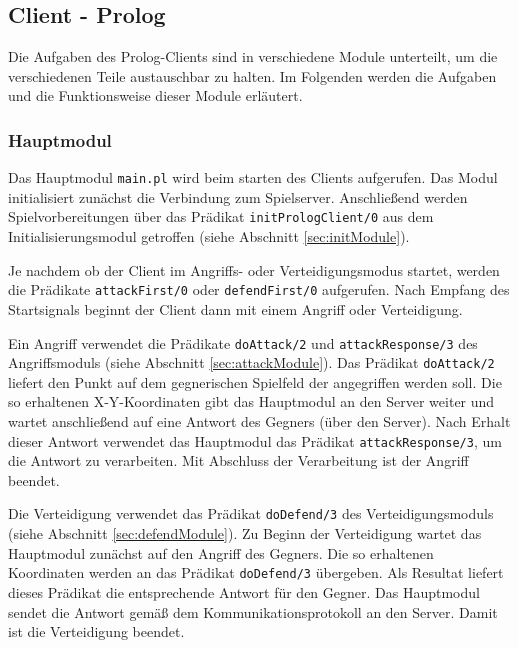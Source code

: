 \subsection{Client - Prolog} \label{sec:Prologclient}
	Die Aufgaben des Prolog-Clients sind in verschiedene Module unterteilt, um die verschiedenen Teile austauschbar zu halten. 
	Im Folgenden werden die Aufgaben und die Funktionsweise dieser Module erläutert.
	



\subsubsection{Hauptmodul}
	Das Hauptmodul \texttt{main.pl} wird beim starten des Clients aufgerufen. Das Modul initialisiert zunächst die Verbindung zum
	Spielserver. Anschließend werden Spielvorbereitungen über das Prädikat \texttt{initPrologClient/0} aus dem 
	Initialisierungsmodul getroffen (siehe Abschnitt \ref{sec:initModule}).
	
	Je nachdem ob der Client im Angriffs- oder Verteidigungsmodus startet, werden die Prädikate \texttt{attackFirst/0} oder
	\texttt{defendFirst/0} aufgerufen. Nach Empfang des Startsignals beginnt der Client dann mit einem Angriff oder Verteidigung.
	
	Ein Angriff verwendet die Prädikate \texttt{doAttack/2} und \texttt{attackResponse/3} des Angriffsmoduls (siehe Abschnitt
	\ref{sec:attackModule}).
	Das Prädikat \texttt{doAttack/2} liefert den Punkt auf dem gegnerischen Spielfeld der angegriffen werden soll.
	Die so erhaltenen X-Y-Koordinaten gibt das Hauptmodul an den Server weiter und wartet anschließend auf eine Antwort des 
	Gegners (über den Server). 
	Nach Erhalt dieser Antwort verwendet das Hauptmodul das Prädikat \texttt{attackResponse/3}, um die Antwort zu verarbeiten.
	Mit Abschluss der Verarbeitung ist der Angriff beendet.
	
	Die Verteidigung verwendet das Prädikat \texttt{doDefend/3} des Verteidigungsmoduls (siehe Abschnitt \ref{sec:defendModule}).
	Zu Beginn der Verteidigung wartet das Hauptmodul zunächst auf den Angriff des Gegners. Die so erhaltenen Koordinaten
	werden an das Prädikat \texttt{doDefend/3} übergeben. Als Resultat liefert dieses Prädikat die entsprechende Antwort für den
	Gegner. Das Hauptmodul sendet die Antwort gemäß dem Kommunikationsprotokoll an den Server. Damit ist die Verteidigung 
	beendet.
	

